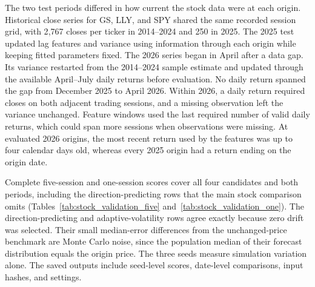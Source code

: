 The two test periods differed in how current the stock data were at each origin. Historical close series for GS, LLY, and SPY shared the same recorded session grid, with 2{,}767 closes per ticker in 2014--2024 and 250 in 2025. The 2025 test updated lag features and variance using information through each origin while keeping fitted parameters fixed. The 2026 series began in April after a data gap. Its variance restarted from the 2014--2024 sample estimate and updated through the available April--July daily returns before evaluation. No daily return spanned the gap from December 2025 to April 2026. Within 2026, a daily return required closes on both adjacent trading sessions, and a missing observation left the variance unchanged. Feature windows used the last required number of valid daily returns, which could span more sessions when observations were missing. At evaluated 2026 origins, the most recent return used by the features was up to four calendar days old, whereas every 2025 origin had a return ending on the origin date.

Complete five-session and one-session scores cover all four candidates and both periods, including the direction-predicting rows that the main stock comparison omits (Tables~\ref{tab:stock_validation_five} and~\ref{tab:stock_validation_one}). The direction-predicting and adaptive-volatility rows agree exactly because zero drift was selected. Their small median-error differences from the unchanged-price benchmark are Monte Carlo noise, since the population median of their forecast distribution equals the origin price. The three seeds measure simulation variation alone. The saved outputs include seed-level scores, date-level comparisons, input hashes, and settings.

\begin{table}[H]
\centering
\caption{Complete five-session stock forecast scores for the four selected candidates: JumpHMM, the unchanged-price benchmark, and the adaptive-volatility and direction-predicting models. Each ticker has 245 origins in 2025 and 17 in August--September 2026. The MAE scores medians, and the RMSE scores means. Monetary values are in dollars per share. Coverage and width describe central 90\% intervals. Scores average dates within each of three 10{,}000-path runs and then average the runs. The direction-predicting rows equal the adaptive-volatility rows because earlier-data selection chose zero drift.}\label{tab:stock_validation_five}
\resizebox{\textwidth}{!}{}
\end{table}

\begin{table}[H]
\centering
\caption{Complete one-session stock forecast scores for the same four candidates. Each ticker has 249 origins in 2025 and 21 in August--September 2026. Units, point summaries, interval definitions, and aggregation follow Supplementary Table~\ref{tab:stock_validation_five}.}\label{tab:stock_validation_one}
\resizebox{\textwidth}{!}{}
\end{table}
\FloatBarrier
